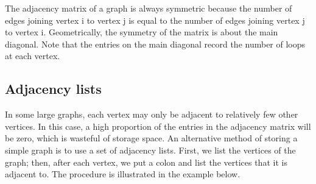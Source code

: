 \documentclass{article}
\begin{document}
The adjacency matrix of a graph is always symmetric because the number of edges joining vertex i to vertex j is equal to the number of edges joining vertex j to vertex i. Geometrically, the symmetry of the matrix is about the main diagonal. Note that the entries on the main diagonal record the number of loops at each vertex.

\subsection*{Adjacency lists}

In some large graphs, each vertex may only be adjacent to relatively few other vertices. In this case, a high proportion of the entries in the adjacency matrix will be zero, which is wasteful of storage space. An alternative method of storing a simple graph is to use a set of adjacency lists. First, we list the vertices of the graph; then, after each vertex, we put a colon and list the vertices that it is adjacent to. The procedure is illustrated in the example below.
\end{document}
